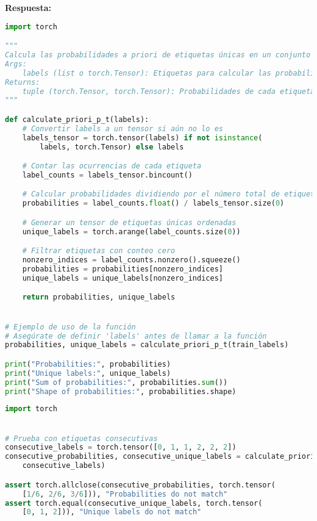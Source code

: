 \documentclass[spanish]{article}
\begin{document}
\begin{enumerate}
\begin{enumerate}
\vspace{15px}
\par \textbf{Respuesta:}

\begin{lstlisting}[language=Python, caption=Calculo a priori]
import torch

"""
Calcula las probabilidades a priori de etiquetas únicas en un conjunto de datos.
Args:
    labels (list o torch.Tensor): Etiquetas para calcular las probabilidades.
Returns:
    tuple (torch.Tensor, torch.Tensor): Probabilidades de cada etiqueta y etiquetas únicas.
"""

def calculate_priori_p_t(labels):
    # Convertir labels a un tensor si aún no lo es
    labels_tensor = torch.tensor(labels) if not isinstance(
        labels, torch.Tensor) else labels

    # Contar las ocurrencias de cada etiqueta
    label_counts = labels_tensor.bincount()

    # Calcular probabilidades dividiendo por el número total de etiquetas
    probabilities = label_counts.float() / labels_tensor.size(0)

    # Generar un tensor de etiquetas únicas ordenadas
    unique_labels = torch.arange(label_counts.size(0))

    # Filtrar etiquetas con conteo cero
    nonzero_indices = label_counts.nonzero().squeeze()
    probabilities = probabilities[nonzero_indices]
    unique_labels = unique_labels[nonzero_indices]

    return probabilities, unique_labels


# Ejemplo de uso de la función
# Asegúrate de definir 'labels' antes de llamar a la función
probabilities, unique_labels = calculate_priori_p_t(train_labels)

print("Probabilities:", probabilities)
print("Unique labels:", unique_labels)
print("Sum of probabilities:", probabilities.sum())
print("Shape of probabilities:", probabilities.shape)
\end{lstlisting}

\begin{lstlisting}[language=Python, caption=Pruebas Unitarias Calculo a priori]
import torch


# Prueba con etiquetas consecutivas
consecutive_labels = torch.tensor([0, 1, 1, 2, 2, 2])
consecutive_probabilities, consecutive_unique_labels = calculate_priori_p_t(
    consecutive_labels)

assert torch.allclose(consecutive_probabilities, torch.tensor(
    [1/6, 2/6, 3/6])), "Probabilities do not match"
assert torch.equal(consecutive_unique_labels, torch.tensor(
    [0, 1, 2])), "Unique labels do not match"


\end{lstlisting}
\end{enumerate}
\end{enumerate}
\end{document}
